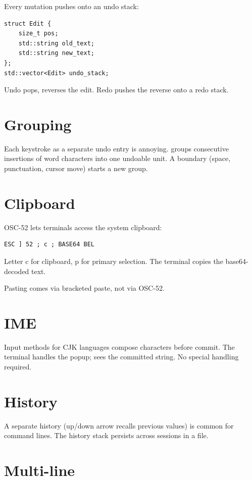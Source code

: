 Every mutation pushes onto an undo stack:

\begin{lstlisting}
struct Edit {
    size_t pos;
    std::string old_text;
    std::string new_text;
};
std::vector<Edit> undo_stack;
\end{lstlisting}

Undo pops, reverses the edit. Redo pushes the reverse onto
a redo stack.

\section{Grouping}

Each keystroke as a separate undo entry is annoying. \maya{}
groups consecutive insertions of word characters into one
undoable unit. A boundary (space, punctuation, cursor move)
starts a new group.

\section{Clipboard}

OSC-52 lets terminals access the system clipboard:

\begin{lstlisting}
ESC ] 52 ; c ; BASE64 BEL
\end{lstlisting}

Letter c for clipboard, p for primary selection. The
terminal copies the base64-decoded text.

Pasting comes via bracketed paste, not via OSC-52.

\section{IME}

Input methods for CJK languages compose characters before
commit. The terminal handles the popup; \maya{} sees the
committed string. No special handling required.

\section{History}

A separate history (up/down arrow recalls previous values)
is common for command lines. The history stack persists
across sessions in a file.

\section{Multi-line}

